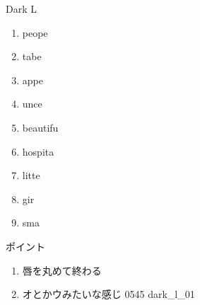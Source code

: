\documentclass[aspectratio=169, xcolor={dvipsnames,table}]{beamer}
\begin{document}
\begin{frame}[plain]{Dark L}
  \large

  \begin{enumerate}
    \item peope

    \item tabe

    \item appe

    \item unce

    \item beautifu

    \item hospita

    \item litte

    \item gir

    \item sma
  \end{enumerate}

  \vspace*{10pt}

  \small ポイント

  \begin{enumerate}
    \item 唇を丸めて終わる

    \item オとかウみたいな感じ \hfill{\tiny 0545}\,{\scriptsize {}}\,{\tiny dark\_l\_01}
  \end{enumerate}
\end{frame}
\end{document}
